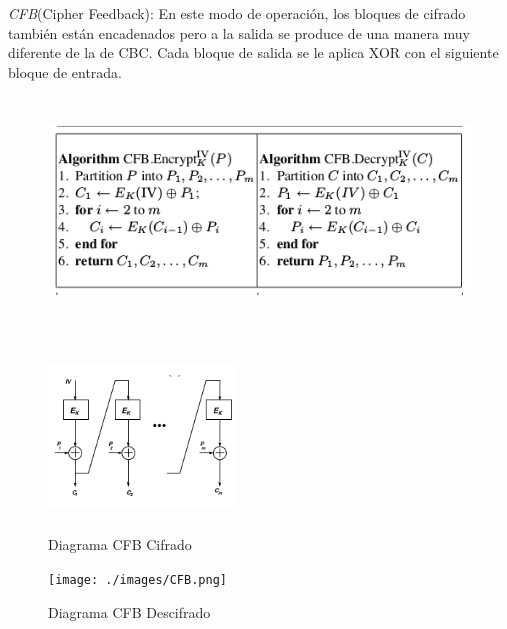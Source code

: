 \documentclass[12pt,oneside,onecolumn,openany]{report}
\begin{document}
\textit{CFB}(Cipher Feedback): En este modo de operación, los bloques de cifrado también están encadenados pero a la salida se produce de una manera muy diferente de la de CBC. Cada bloque de salida se le aplica XOR con el siguiente bloque de entrada.\\
\begin{figure}[H]
\centering
	\includegraphics[width=14cm, height=6cm]{./images/pcfb.png}
	
\end{figure}
\begin{figure}[H]
\centering
	\includegraphics[width=5cm, height=5cm]{./images/cfb1.png}
	\caption{Diagrama CFB Cifrado}
	\label{fig:1-5-1}
\end{figure}
\begin{figure}[H]
\centering
	\texttt{[image: ./images/CFB.png]}
	\caption{Diagrama CFB Descifrado}
	\label{fig:1-5-1}
\end{figure}
\end{document}
